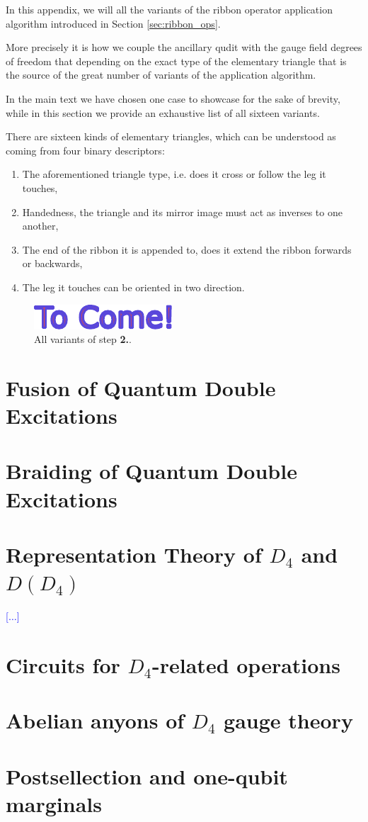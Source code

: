 \documentclass[two column]{article}
\newcommand{\jovan}[1]{\textcolor{blue}{[#1]}}
\begin{document}
In this appendix, we will all the variants of the ribbon operator application algorithm introduced in Section \ref{sec:ribbon_ops}.

More precisely it is how we couple the ancillary qudit with the gauge field degrees of freedom that depending on the exact type of the elementary triangle that is the source of the great number of variants of the application algorithm. 

In the main text we have chosen one case to showcase for the sake of brevity, while in this section we provide an exhaustive list of all sixteen variants.

There are sixteen kinds of elementary triangles, which can be understood as coming from four binary descriptors:\begin{enumerate}
	\item The aforementioned triangle type, i.e. does it cross or follow the leg it touches,
	\item Handedness, the triangle and its mirror image must act as inverses to one another,
	\item The end of the ribbon it is appended to, does it extend the ribbon forwards or backwards,
	\item The leg it touches can be oriented in two direction.
\end{enumerate} 



\begin{figure}
    \centering
    \includegraphics[width = 0.5\linewidth]{Figures/all_triangles.pdf}
    \caption{All variants of step \textbf{2.}.}
    \label{fig:all_triang}
\end{figure}

\section{Fusion of Quantum Double Excitations}\label{app:fusion}

\section{Braiding of Quantum Double Excitations}\label{app:braid}

\section{Representation Theory of $D_4$ and $D(D_4)$}\label{app:reps}
\jovan{$\ldots$}

\section{Circuits for $D_4$-related operations}\label{app:cirqs}

\section{Abelian anyons of $D_4$ gauge theory}\label{app:abl}

\section{Postsellection and one-qubit marginals}\label{app:marg}
\end{document}
